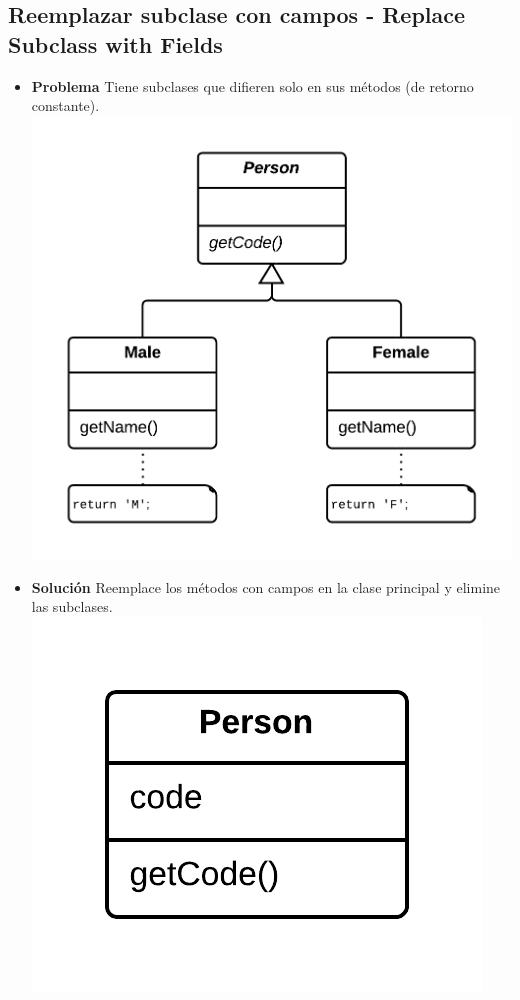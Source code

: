 \documentclass[11pt,a4paper,oneside]{book}
\begin{document}
\subsection{Reemplazar subclase con campos -  Replace Subclass with Fields}
\label{replacesubclasswithfields}
\begin{itemize}
    \item \textbf{Problema} Tiene subclases que difieren solo en sus métodos (de retorno constante).\\
    \centering \includegraphics[scale=0.2]{replacesubclasswithfieldsproblem}
    \item \textbf{Solución} Reemplace los métodos con campos en la clase principal y elimine las subclases.\\
    \centering \includegraphics[scale=0.2]{replacesubclasswithfieldssolution}
\end{itemize}
\end{document}
